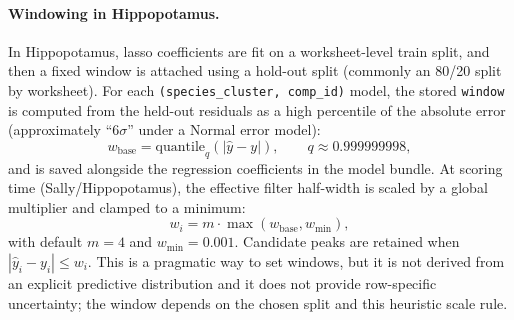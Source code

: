 \documentclass[11pt]{article}
\begin{document}
\paragraph{Windowing in Hippopotamus.}
In Hippopotamus, lasso coefficients are fit on a worksheet-level train split, and then a fixed window is attached using a
hold-out split (commonly an 80/20 split by worksheet). For each \texttt{(species\_cluster, comp\_id)} model, the stored
\texttt{window} is computed from the held-out residuals as a high percentile of the absolute error (approximately
``$6\sigma$'' under a Normal error model):
\[
  w_{\mathrm{base}} = \mathrm{quantile}_{q}(|\hat{y}-y|),\qquad q\approx 0.999999998,
\]
and is saved alongside the regression coefficients in the model bundle. At scoring time (Sally/Hippopotamus), the
effective filter half-width is scaled by a global multiplier and clamped to a minimum:
\[
  w_i = m\cdot \max(w_{\mathrm{base}}, w_{\min}),
\]
with default $m=4$ and $w_{\min}=0.001$. Candidate peaks are retained when $|\hat{y}_i - y_i| \le w_i$.
This is a pragmatic way to set windows, but it is not derived from an explicit predictive distribution and it does not
provide row-specific uncertainty; the window depends on the chosen split and this heuristic scale rule.
\end{document}
